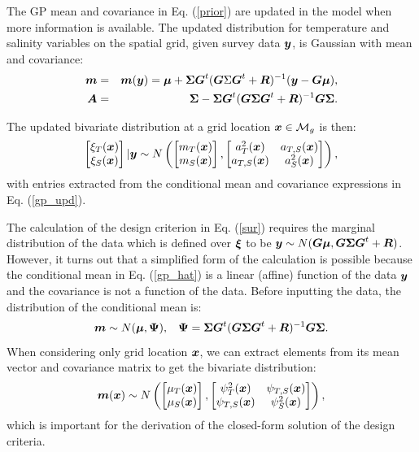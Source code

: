 \documentclass[aoas]{imsart}
\begin{document}
The GP mean and covariance in Eq. (\ref{prior}) are updated in the
model when more information is available. The updated distribution for
temperature and salinity variables on the spatial grid, given survey
data ${\boldsymbol y}$, is Gaussian with mean and covariance:
\begin{eqnarray}\label{gp_upd}
  \bm &=& \bm(\by) = \bmu+\bSigma \bG^t (\bG \Sigma \bG^t+\bR)^{-1}(\by-\bG \bmu),  \\
  \bA &=& \bSigma - \bSigma \bG^t (\bG \bSigma \bG^t+\bR)^{-1} \bG
          \bSigma.\nonumber
\end{eqnarray}

The updated bivariate distribution at a grid location ${\boldsymbol x} \in
\mathcal{M}_g$ is then: 
\begin{equation}\label{gp_hat}
\begin{bmatrix}
\xi_T(\bx) \\
\xi_S(\bx)
\end{bmatrix}
 |\by
 \sim N \left( 
\begin{bmatrix} m_{T}(\bx)\\
m_{S}(\bx)
\end{bmatrix},\begin{bmatrix}
a_{T}^2(\bx) & a_{T,S}(\bx)  \\
a_{T,S}(\bx)  & a_{S}^2(\bx)  
\end{bmatrix}
\right),
\end{equation}
with entries extracted from the conditional mean and covariance
expressions in Eq. (\ref{gp_upd}).

The calculation of the design criterion in Eq. (\ref{sur}) requires
the marginal distribution of the data which is defined over ${\boldsymbol \xi}$ to
be ${\boldsymbol y} \sim N( {\boldsymbol G} {\boldsymbol \mu},{\boldsymbol G} {\boldsymbol \Sigma} {\boldsymbol G}^t+{\boldsymbol R})$.  However, it turns
out that a simplified form of the calculation is possible because the
conditional mean in Eq. (\ref{gp_hat}) is a linear (affine) function of
the data ${\boldsymbol y}$ and the covariance is not a function of the data.
Before inputting the data, the distribution of the conditional mean is:
\begin{equation}\label{distxi} \bm \sim N(\bmu , \bPsi), \hspace{3mm}
  \bPsi=\bSigma \bG^t (\bG \bSigma \bG^t+\bR)^{-1} \bG \bSigma.
\end{equation} 
When considering only grid location ${\boldsymbol x}$, we can
extract elements from its mean vector and covariance matrix to get the
bivariate distribution:
\begin{equation}\label{dist_mxi}
  \bm(\bx) \sim N \left( \begin{bmatrix}
      \mu_{T}(\bx) \\
      \mu_{S}(\bx) \end{bmatrix}, \begin{bmatrix}
      \psi^2_{T}(\bx) & \psi_{T,S}(\bx)\\
      \psi_{T,S}(\bx) & \psi^2_{S}(\bx) \end{bmatrix} \right),
\end{equation}
which is important for the derivation of the closed-form solution of the design criteria.
\end{document}
